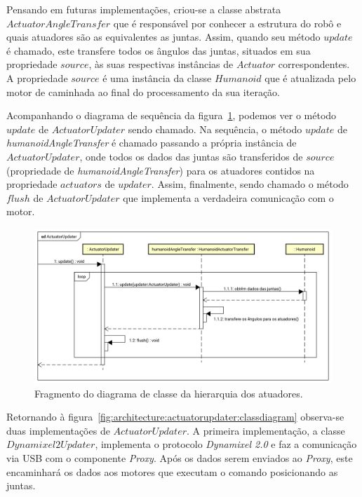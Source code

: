 Pensando em futuras implementações, criou-se a classe abstrata $ActuatorAngleTransfer$ que é responsável por conhecer a estrutura do robô e quais atuadores são as equivalentes as juntas. Assim, quando seu método $update$ é chamado, este transfere todos os ângulos das juntas, situados em sua propriedade $source$, às suas respectivas instâncias de $Actuator$ correspondentes. A propriedade $source$ é uma instância da classe $Humanoid$ que é atualizada pelo motor de caminhada ao final do processamento da sua iteração.

Acompanhando o diagrama de sequência da figura~\ref{fig:architecture:actuatorupdater:sequence}, podemos ver o método $update$ de $ActuatorUpdater$ sendo chamado. Na sequência, o método $update$ de \textit{humanoidAngleTransfer} é chamado passando a própria instância de $ActuatorUpdater$, onde todos os dados das juntas são transferidos de $source$ (propriedade de \textit{humanoidAngleTransfer}) para os atuadores contidos na propriedade $actuators$ de $updater$. Assim, finalmente, sendo chamado o método $flush$ de $ActuatorUpdater$ que implementa a verdadeira comunicação com o motor.

\begin{figure}[htb]
	\centering
	\includegraphics[scale=0.45]{imagens/svg/softwarearchitecture-actuatorudpater-sequence}
	\caption{Fragmento do diagrama de classe da hierarquia dos atuadores.}
	\label{fig:architecture:actuatorupdater:sequence}
\end{figure}

Retornando à figura~\ref{fig:architecture:actuatorupdater:classdiagram} observa-se duas implementações de $ActuatorUpdater$. A primeira implementação, a classe $Dynamixel2Updater$, implementa o protocolo \textit{Dynamixel 2.0} e faz a comunicação via USB com o componente \textit{Proxy}. Após os dados serem enviados ao \textit{Proxy}, este encaminhará os dados aos motores que executam o comando posicionando as juntas.

